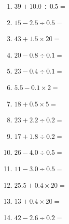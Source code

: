 \documentclass[12pt]{article}
\begin{document}
\begin{enumerate}
\item \large $ 39 + 10.0 \div 0.5 = $ \vspace{1.6cm}
\item \large $ 15 - 2.5 \div 0.5 = $ \vspace{1.6cm}
\item \large $ 43 + 1.5 \times 20 = $ \vspace{1.6cm}
\item \large $ 20 - 0.8 \div 0.1 = $ \vspace{1.6cm}
\newpage
\item \large $ 23 - 0.4 \div 0.1 = $ \vspace{1.6cm}
\item \large $ 5.5 - 0.1 \times 2 = $ \vspace{1.6cm}
\item \large $ 18 + 0.5 \times 5 = $ \vspace{1.6cm}
\item \large $ 23 + 2.2 \div 0.2 = $ \vspace{1.6cm}
\item \large $ 17 + 1.8 \div 0.2 = $ \vspace{1.6cm}
\item \large $ 26 - 4.0 \div 0.5 = $ \vspace{1.6cm}
\item \large $ 11 - 3.0 \div 0.5 = $ \vspace{1.6cm}
\item \large $ 25.5 + 0.4 \times 20 = $ \vspace{1.6cm}
\item \large $ 13 + 0.4 \times 20 = $ \vspace{1.6cm}
\item \large $ 42 - 2.6 \div 0.2 = $ \vspace{1.6cm}
\end{enumerate}
\newpage
\end{document}
